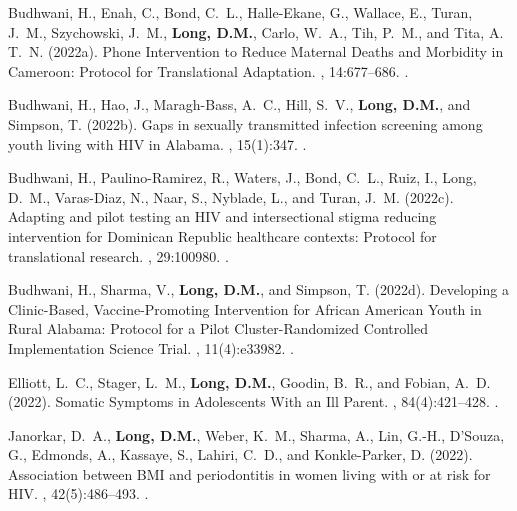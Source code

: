 \begin{thebibliography}{}
Budhwani, H., Enah, C., Bond, C.~L., Halle-Ekane, G., Wallace, E., Turan,
  J.~M., Szychowski, J.~M., \textbf{Long, D.M.}, Carlo, W.~A., Tih, P.~M., and Tita, A.
  T.~N. (2022a).
 {Phone} {Intervention} to {Reduce} {Maternal} {Deaths} and
  {Morbidity} in {Cameroon}: {Protocol} for {Translational} {Adaptation}.
, 14:677--686.
.  


Budhwani, H., Hao, J., Maragh-Bass, A.~C., Hill, S.~V., \textbf{Long, D.M.}, and
  Simpson, T. (2022b).
\newblock Gaps in sexually transmitted infection screening among youth living
  with {HIV} in {Alabama}.
, 15(1):347.
.  


Budhwani, H., Paulino-Ramirez, R., Waters, J., Bond, C.~L., Ruiz, I., Long,
  D.~M., Varas-Diaz, N., Naar, S., Nyblade, L., and Turan, J.~M. (2022c).
\newblock Adapting and pilot testing an {HIV} and intersectional stigma
  reducing intervention for {Dominican} {Republic} healthcare contexts:
  {Protocol} for translational research.
, 29:100980.
.  


Budhwani, H., Sharma, V., \textbf{Long, D.M.}, and Simpson, T. (2022d).
\newblock Developing a {Clinic}-{Based}, {Vaccine}-{Promoting} {Intervention}
  for {African} {American} {Youth} in {Rural} {Alabama}: {Protocol} for a
  {Pilot} {Cluster}-{Randomized} {Controlled} {Implementation} {Science}
  {Trial}.
, 11(4):e33982.
.  


Elliott, L.~C., Stager, L.~M., \textbf{Long, D.M.}, Goodin, B.~R., and Fobian, A.~D.
  (2022).
\newblock Somatic {Symptoms} in {Adolescents} {With} an {Ill} {Parent}.
, 84(4):421--428.
.  



Janorkar, D.~A., \textbf{Long, D.M.}, Weber, K.~M., Sharma, A., Lin, G.-H., D'Souza,
  G., Edmonds, A., Kassaye, S., Lahiri, C.~D., and Konkle-Parker, D. (2022).
\newblock Association between {BMI} and periodontitis in women living with or
  at risk for {HIV}.
,
  42(5):486--493.
.  



\end{thebibliography}
